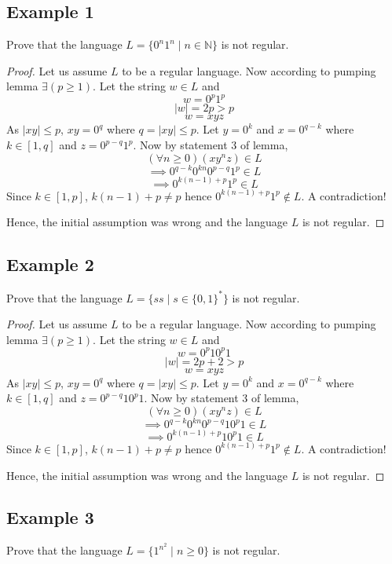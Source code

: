 \documentclass{article}
\begin{document}
\subsection{Example 1}

Prove that the language $L=\{0^n1^n\mid n\in \mathbb{N}\}$ is not regular.

\begin{proof}
Let us assume $L$ to be a regular language. Now according to pumping lemma $\exists(p\ge1)$.
Let the string $w\in L$ and $$w=0^p1^p$$ $$\mid w\mid=2p>p $$ $$w=xyz$$
As $\mid xy\mid\le p$, $xy=0^q$ where $q=\mid xy\mid\le p$. Let $y=0^k$ and $x=0^{q-k}$ where $k\in[1,q]$ and $z=0^{p-q}1^p$.
Now by statement 3 of lemma, 
$$(\forall n\ge0)(xy^nz)\in L$$
$$\implies 0^{q-k}0^{kn}0^{p-q}1^p\in L$$
$$\implies 0^{k(n-1)+p}1^p\in L$$
Since $k\in[1,p]$, $k(n-1)+p\ne p$ hence $0^{k(n-1)+p}1^p\notin L$. A contradiction!

Hence, the initial assumption was wrong and the language $L$ is not regular.
\end{proof}

\subsection{Example 2}

Prove that the language $L=\{ss\mid s\in \{ 0,1\}^*\}$ is not regular.

\begin{proof}
Let us assume $L$ to be a regular language. Now according to pumping lemma $\exists(p\ge1)$.
Let the string $w\in L$ and $$w=0^p10^p1$$ $$\mid w\mid=2p+2>p $$ $$w=xyz$$
As $\mid xy\mid\le p$, $xy=0^q$ where $q=\mid xy\mid\le p$. Let $y=0^k$ and $x=0^{q-k}$ where $k\in[1,q]$ and $z=0^{p-q}10^p1$.
Now by statement 3 of lemma, 
$$(\forall n\ge0)(xy^nz)\in L$$
$$\implies 0^{q-k}0^{kn}0^{p-q}10^p1\in L$$
$$\implies 0^{k(n-1)+p}10^p1\in L$$
Since $k\in[1,p]$, $k(n-1)+p\ne p$ hence $0^{k(n-1)+p}1^p\notin L$. A contradiction!

Hence, the initial assumption was wrong and the language $L$ is not regular.
\end{proof}

\subsection{Example 3}

Prove that the language $L=\{1^{n^2}\mid n\ge 0\}$ is not regular.
\end{document}

